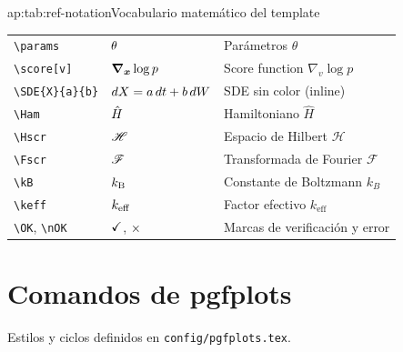 \begin{acadtable}[H]{ap:tab:ref-notation}{Vocabulario matemático del template}
\begin{tabularx}{\textwidth}{l l X}
    \texttt{\textbackslash params}& $\theta$ & Parámetros $\theta$ \\
    \texttt{\textbackslash score[v]}& $\grad_{\bm{x}}\log p$ & Score function $\nabla_v\log p$ \\
    \texttt{\textbackslash SDE\{X\}\{a\}\{b\}}
      & $dX = a\,dt + b\,dW$ & SDE sin color (inline) \\
    \midrule
    \texttt{\textbackslash Ham}   & $\hat{H}$  & Hamiltoniano $\hat{H}$ \\
    \texttt{\textbackslash Hscr}  & $\mathscr{H}$ & Espacio de Hilbert $\mathscr{H}$ \\
    \texttt{\textbackslash Fscr}  & $\mathscr{F}$ & Transformada de Fourier $\mathscr{F}$ \\
    \texttt{\textbackslash kB}    & $k_{\mathrm{B}}$   & Constante de Boltzmann $k_B$ \\
    \texttt{\textbackslash keff}  & $k_{\mathrm{eff}}$ & Factor efectivo $k_{\mathrm{eff}}$ \\
    \midrule
    \texttt{\textbackslash OK}, \texttt{\textbackslash nOK}
      & $\checkmark$, $\times$ & Marcas de verificación y error \\
    \bottomrule
  \end{tabularx}
\end{acadtable}

\section{Comandos de pgfplots}
\label{ap:ref:pgfplots}

Estilos y ciclos definidos en \texttt{config/pgfplots.tex}.

